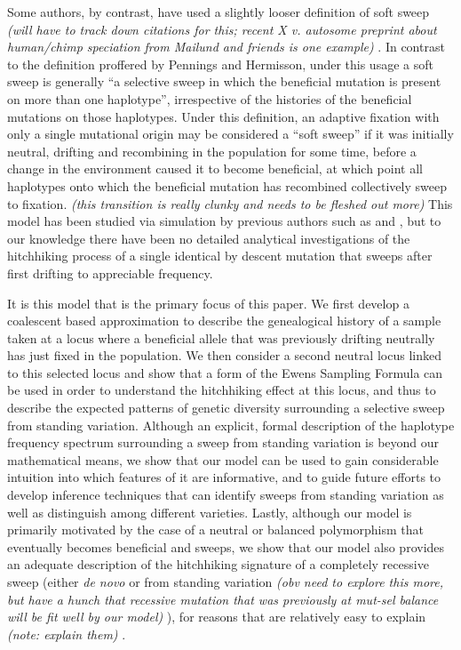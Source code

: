 \documentclass[a4paper,10pt]{article}
\newcommand{\jb}[1]{{\it\color{blue} (#1)} }
\begin{document}
Some authors, by contrast, have used a slightly looser definition of soft sweep \jb{will have to track down citations for this; recent X v. autosome preprint about human/chimp speciation from Mailund and friends is one example}. In contrast to the definition proffered by Pennings and Hermisson, under this usage a soft sweep is generally ``a selective sweep in which the beneficial mutation is present on more than one haplotype'', irrespective of the histories of the beneficial mutations on those haplotypes. Under this definition, an adaptive fixation with only a single mutational origin may be considered a ``soft sweep'' if it was initially neutral, drifting and recombining in the population for some time, before a change in the environment caused it to become beneficial, at which point all haplotypes onto which the beneficial mutation has recombined collectively sweep to fixation. \jb{this transition is really clunky and needs to be fleshed out more}This model has been studied via simulation by previous authors such as \cite{Innan:2004bka} and \cite{Przeworski:2005wi}, but to our knowledge there have been no detailed analytical investigations of the hitchhiking process of a single identical by descent mutation that sweeps after first drifting to appreciable frequency.

It is this model that is the primary focus of this paper. We first develop a coalescent based approximation to describe the genealogical history of a sample taken at a locus where a beneficial allele that was previously drifting neutrally has just fixed in the population. We then consider a second neutral locus linked to this selected locus and show that a form of the Ewens Sampling Formula can be used in order to understand the hitchhiking effect at this locus, and thus to describe the expected patterns of genetic diversity surrounding a selective sweep from standing variation. Although an explicit, formal description of the haplotype frequency spectrum surrounding a sweep from standing variation is beyond our mathematical means, we show that our model can be used to gain considerable intuition into which features of it are informative, and to guide future efforts to develop inference techniques that can identify sweeps from standing variation as well as distinguish among different varieties. Lastly, although our model is primarily motivated by the case of a neutral or balanced polymorphism that eventually becomes beneficial and sweeps, we show that our model also provides an adequate description of the hitchhiking signature of a completely recessive sweep (either \textit{de novo} or from standing variation \jb{obv need to explore this more, but have a hunch that recessive mutation that was previously at mut-sel balance will be fit well by our model}), for reasons that are relatively easy to explain \jb{note: explain them}.
\end{document}
